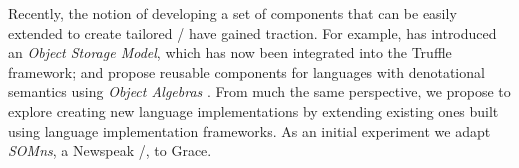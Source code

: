 Recently, the notion of developing a set of components that can be easily extended to create tailored \vms/ have gained traction. For example, \citet{WoB2014} has introduced an \emph{Object Storage Model}, which has now been integrated into the Truffle framework; and \citet{Inostroza2015} propose reusable components for languages with denotational semantics using \emph{Object Algebras} \cite{Oliveira2012}. From much the same perspective, we propose to explore creating new language implementations by extending existing ones built using language implementation frameworks. As an initial experiment we adapt \emph{SOMns}, a Newspeak \vm/, to Grace.


%




%






% 
